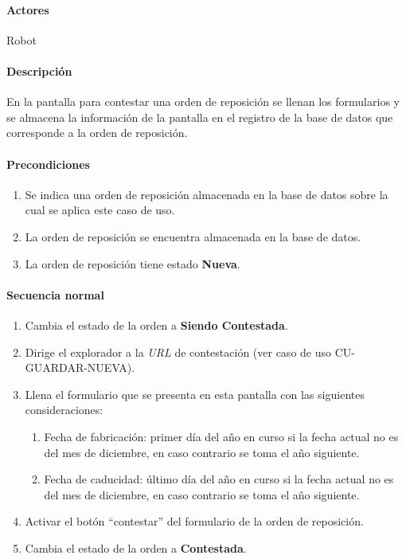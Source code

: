\paragraph{Actores}
Robot
\paragraph{Descripción}
En la pantalla para contestar una orden de reposición se llenan los formularios y se almacena la información de la pantalla en el registro de la base de datos que corresponde a la orden de reposición.
\paragraph{Precondiciones}
\begin{enumerate}
  \item Se indica una orden de reposición almacenada en la base de datos sobre la cual se aplica este caso de uso.
  \item La orden de reposición se encuentra almacenada en la base de datos.
  \item La orden de reposición tiene estado \textbf{Nueva}.
\end{enumerate}
\paragraph{Secuencia normal}
\begin{enumerate}
  \item Cambia el estado de la orden a \textbf{Siendo Contestada}.
  \item Dirige el explorador a la \textit{URL} de contestación (ver caso de uso CU-GUARDAR-NUEVA).
  \item Llena el formulario que se presenta en esta pantalla con las siguientes consideraciones:
  \begin{enumerate}
    \item Fecha de fabricación: primer día del año en curso si la fecha actual no es del mes de diciembre, en caso contrario se toma el año siguiente.
    \item Fecha de caducidad: último día del año en curso si la fecha actual no es del mes de diciembre, en caso contrario se toma el año siguiente.
  \end{enumerate}
  \item Activar el botón ``contestar'' del formulario de la orden de reposición.
  \item Cambia el estado de la orden a \textbf{Contestada}.
\end{enumerate}
